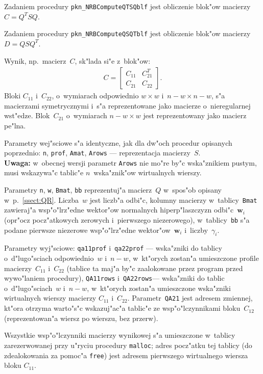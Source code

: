 Zadaniem procedury \texttt{pkn\_NRBComputeQTSQblf} jest obliczenie blok"ow
macierzy $C=Q^TSQ$.

Zadaniem procedury \texttt{pkn\_NRBComputeQSQTblf} jest obliczenie blok"ow
macierzy $D=QSQ^T$.

Wynik, np.\ macierz~$C$, sk"lada si"e z~blok"ow:
\begin{align*}
  C = \left[\begin{array}{cc}
     C_{11} & C_{21}^T \\ C_{21} & C_{22}
  \end{array}\right].
\end{align*}
Bloki $C_{11}$ i~$C_{22}$, o~wymiarach odpowiednio $w\times w$
i~$n-w\times n-w$, s"a macierzami symetrycznymi i~s"a reprezentowane
jako macierze o~nieregularnej wst"edze. Blok~$C_{21}$ o~wymiarach
$n-w\times w$ jest reprezentowany jako macierz pe"lna.

Parametry wej"sciowe s"a identyczne, jak dla dw"och procedur
opisanych poprzednio: \texttt{n}, \texttt{prof}, \texttt{Amat},
\texttt{Arows} --- reprezentacja macierzy~$S$. \\
\textbf{Uwaga:} w~obecnej wersji parametr \texttt{Arows} nie mo"re by"c
wska"znikiem pustym, musi wskazywa"c tablic"e $n$~wska"znik"ow wirtualnych
wierszy.

Parametry \texttt{n}, \texttt{w}, \texttt{Bmat}, \texttt{bb} reprezentuj"a
macierz~$Q$ w~spos"ob opisany w~p.~\ref{ssect:QR}. Liczba~$w$ jest liczb"a
odbi"c, kolumny macierzy w~tablicy~\texttt{Bmat} zawieraj"a wsp"o"lrz"edne
wektor"ow normalnych hiperp"laszczyzn odbi"c~$\bm{w}_i$
(opr"ocz pocz"atkowych zerowych i~pierwszego niezerowego),
w~tablicy~\texttt{bb} s"a podane pierwsze niezerowe wsp"o"lrz"edne
wektor"ow~$\bm{w}_i$ i~liczby~$\gamma_i$.


Parametry wyj"sciowe: \texttt{qa11prof} i~\texttt{qa22prof} --- wska"zniki
do tablicy o~d"lugo"sciach odpowiednio~$w$ i~$n-w$, w~kt"orych zostan"a
umieszczone profile macierzy~$C_{11}$ i~$C_{22}$
(tablice ta maj"a by"c zaalokowane przez program przed wywo"laniem
procedury), \texttt{QA11rows} i~\texttt{QA22rows}--- wska"zniki do tablic
o~d"lu\-go"s\-ciach~$w$ i~$n-w$, w~kt"orych zostan"a umieszczone wska"zniki
wirtualnych wierszy macierzy $C_{11}$ i~$C_{22}$.
Parametr~\texttt{QA21} jest adresem zmiennej, kt"ora otrzyma warto"s"c
wskazuj"ac"a tablic"e ze wsp"o"lczynnikami bloku~$C_{12}$ (reprezentowan"a
wiersz po wierszu, bez przerw).

Wszystkie wsp"o"lczynniki macierzy wynikowej s"a umieszczone
w~tablicy zarezerwowanej przy u"ryciu procedury \texttt{malloc};
adres pocz"atku tej tablicy (do zdealokowania za pomoc"a \texttt{free})
jest adresem pierwszego wirtualnego wiersza bloku $C_{11}$.

